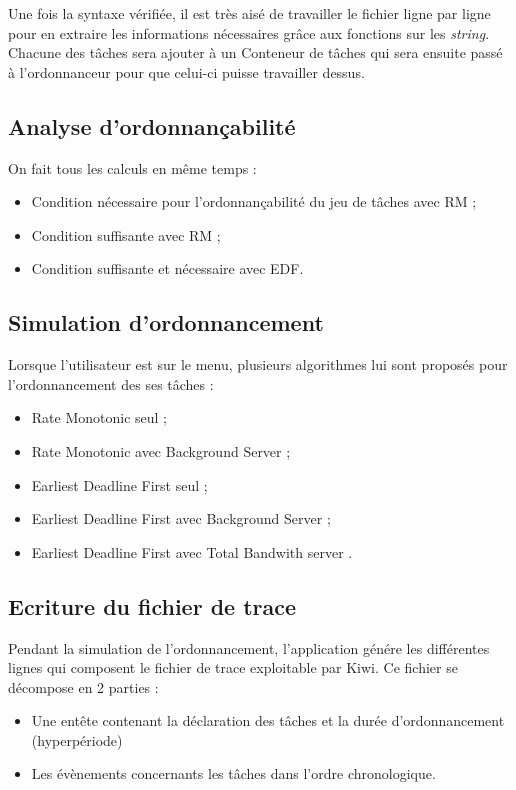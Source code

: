 				Une fois la syntaxe vérifiée, il est très aisé de travailler le fichier ligne par ligne pour en extraire les informations nécessaires grâce aux fonctions sur les \emph{string}. Chacune des tâches sera ajouter à un Conteneur de tâches qui sera ensuite passé à l'ordonnanceur pour que celui-ci puisse travailler dessus.
			
			\subsection{Analyse d'ordonnançabilité}
				On fait tous les calculs en même temps :
				\begin{itemize}
					\item Condition nécessaire pour l'ordonnançabilité du jeu de tâches avec RM ;
					\item Condition suffisante avec RM ;
					\item Condition suffisante et nécessaire avec EDF.
				\end{itemize}
		
			\subsection{Simulation d'ordonnancement}
				Lorsque l'utilisateur est sur le menu, plusieurs algorithmes lui sont proposés pour l'ordonnancement des ses tâches :
				\begin{itemize}
					\item Rate Monotonic seul ;
					\item Rate Monotonic avec Background Server ;
					\item Earliest Deadline First seul ;
					\item Earliest Deadline First avec Background Server ;
					\item Earliest Deadline First avec Total Bandwith server .
				\end{itemize}
				
			\subsection{Ecriture du fichier de trace}
				Pendant la simulation de l'ordonnancement, l'application génére les différentes lignes qui composent le fichier de trace exploitable par Kiwi. Ce fichier se décompose en 2 parties :
					\begin{itemize}
						\item Une entête contenant la déclaration des tâches et la durée d'ordonnancement (hyperpériode)
						\item Les évènements concernants les tâches dans l'ordre chronologique.
					\end{itemize}

